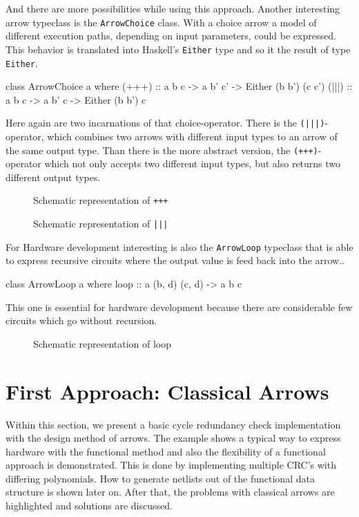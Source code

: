 \documentclass[9pt,final,a4paper,leqno]{article}
\newcommand{\xfig}[4][0.9] {%
    \begin{figure}[ht]
        \begin{center}
            \graphicspath{{./}{Images/}}
            \scalebox{#1}{%
                
            }
            \caption{\label{#4} #3}
        \end{center}
    \end{figure}
}
\newcommand{\hs}[1]{\mbox{\lstinline[basicstyle=\color{textgray}]!#1!}}
\begin{document}
\par
And there are more possibilities while using this approach. Another interesting arrow typeclass is the \hs{ArrowChoice} class. With a choice
arrow a model of different execution paths, depending on input parameters, could be expressed. This behavior is translated into Haskell's
\hs{Either} type and so it the result of type \hs{Either}. 

\begin{haskell}[]
class ArrowChoice a where
  (+++) :: a b c -> a b' c' -> Either (b b') (c c')
  (|||) :: a b c -> a b' c  -> Either (b b')  c 
\end{haskell}

Here again are two incarnations of that choice-operator. There is the \hs{(|||)}-operator, which combines two arrows with different input
types to an arrow of the same output type. Than there is the more abstract version, the \hs{(+++)}-operator which not only accepts two
different input types, but also returns two different output types.  

\xfig[.8]{ArrowPlPlPl}{Schematic representation of \hs{+++}}{figure:plplpl}
\xfig[.8]{ArrowPiPiPi}{Schematic representation of \hs{|||}}{figure:pipipi}

\par
For Hardware development interesting is also the \hs{ArrowLoop} typeclass that is able to express recursive circuits where the output value
is feed back into the arrow..
\begin{haskell}[]
class ArrowLoop a where
  loop :: a (b, d) (c, d) -> a b c
\end{haskell}

This one is essential for hardware development because there are considerable few circuits which go without recursion. 

\xfig[.8]{ArrowLp}{Schematic representation of loop}{figure:loop}





\section{First Approach: Classical Arrows}
Within this section, we present a basic cycle redundancy check implementation with the design method of arrows. The example shows a typical
way to express hardware with the functional method and also the flexibility of a functional approach is demonstrated. This is done by
implementing multiple CRC's with differing polynomials. How to generate netlists out of the functional data structure is shown later on.
After that, the problems with classical arrows are highlighted and solutions are discussed.
\end{document}
